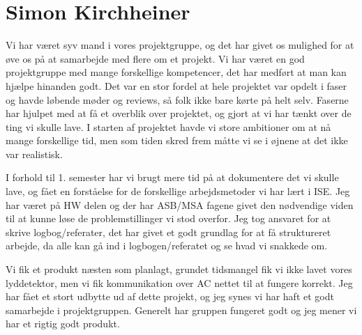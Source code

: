 \section{Simon Kirchheiner}
Vi har været syv mand i vores projektgruppe, og det har givet os mulighed for at øve os på at samarbejde med flere om et projekt. Vi har været en god projektgruppe med mange forskellige kompetencer, det har medført at man kan hjælpe hinanden godt. Det var en stor fordel at hele projektet var opdelt i faser og havde løbende møder og reviews, så folk ikke bare kørte på helt selv. Faserne har hjulpet med at få et overblik over projektet, og gjort at vi har tænkt over de ting vi skulle lave. I starten af projektet havde vi store ambitioner om at nå mange forskellige tid, men som tiden skred frem måtte vi se i øjnene at det ikke var realistisk. 

I forhold til 1. semester har vi brugt mere tid på at dokumentere det vi skulle lave, og fået en forståelse for de forskellige arbejdsmetoder vi har lært i ISE. Jeg har været på HW delen og der har ASB/MSA fagene givet den nødvendige viden til at kunne løse de problemstillinger vi stod overfor. Jeg tog ansvaret for at skrive logbog/referater, det har givet et godt grundlag for at få struktureret arbejde, da alle kan gå ind i logbogen/referatet og se hvad vi snakkede om.

Vi fik et produkt næsten som planlagt, grundet tidsmangel fik vi ikke lavet vores lyddetektor, men vi fik kommunikation over AC nettet til at fungere korrekt. Jeg har fået et stort udbytte ud af dette projekt, og jeg synes vi har haft et godt samarbejde i projektgruppen. Generelt har gruppen fungeret godt og jeg mener vi har et rigtig godt produkt.

